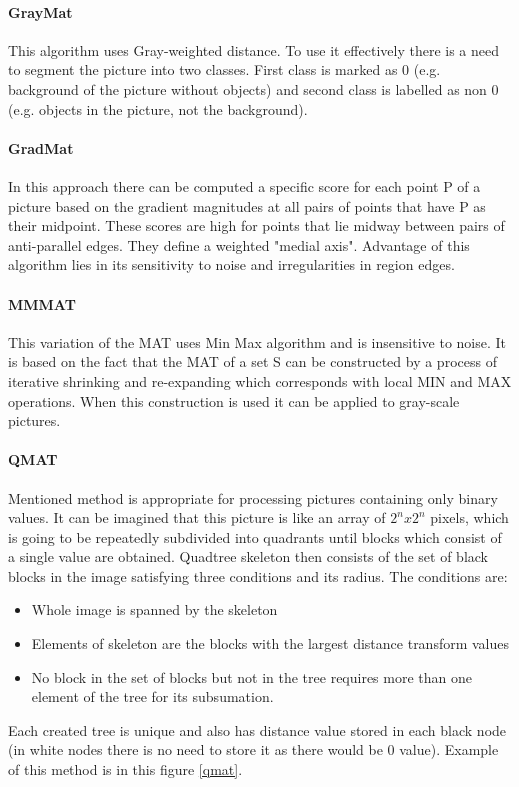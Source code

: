 \paragraph{GrayMat}
This algorithm uses Gray-weighted distance. To use it effectively there is a need to segment the picture into two classes. First class is marked as 0 (e.g. background of the picture without objects) and second class is labelled as non 0 (e.g. objects in the picture, not the background).
\paragraph{GradMat}
In this approach there can be computed a specific score for each point P of a picture based on the gradient magnitudes at all pairs of points that have P as their midpoint. These scores are high for points that lie midway between pairs of anti-parallel edges. They define a weighted "medial axis". 
Advantage of this algorithm lies in its sensitivity to noise and irregularities in region edges.
\paragraph{MMMAT}
This variation of the MAT uses Min Max algorithm and is insensitive to noise. It is based on the fact that the MAT of a set S can be constructed by a process of iterative shrinking and re-expanding which corresponds with local MIN and MAX operations. When this construction is used it can be applied to gray-scale pictures. \cite{MMMAT}
\paragraph{QMAT}
Mentioned method is appropriate for processing pictures containing only binary values. It can be imagined that this picture is like an array of $2^n x 2^n$ pixels, which is going to be repeatedly subdivided into quadrants until blocks which consist of a single value are obtained.
Quadtree skeleton then consists of the set of black blocks in the image satisfying three conditions and its radius. The conditions are:
\begin{itemize}
\item Whole image is spanned by the skeleton
\item Elements of skeleton are the blocks with the largest distance transform values
\item No block in the set of blocks but not in the tree requires more than one element of the tree for its subsumation.
\end{itemize}
Each created tree is unique and also has distance value stored in each black node (in white nodes there is no need to store it as there would be 0 value). Example of this method is in this figure \ref{qmat}.


